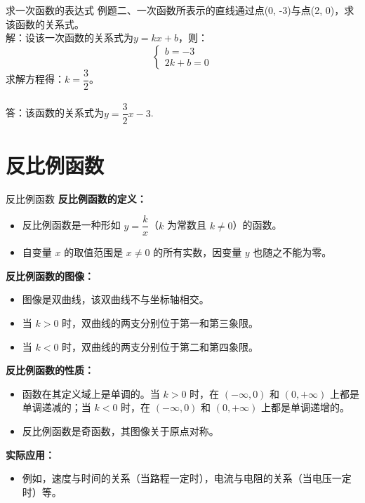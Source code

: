 \documentclass[aspectratio=169]{ctexbeamer} %
\begin{document}
\begin{frame}[t]{求一次函数的表达式}
例题二、一次函数所表示的直线通过点(0, -3)与点(2, 0)，求该函数的关系式。\\
解：设该一次函数的关系式为$y = kx + b$，则：\\
\begin{equation}
\begin{cases}
b = -3 \\
2k + b = 0
\end{cases}
\end{equation}
求解方程得：$k = \dfrac{3}{2}$。\\
\\
答：该函数的关系式为$y = \dfrac{3}{2}x - 3$.
\end{frame}

\section{反比例函数}

\begin{frame}{反比例函数}
    \textbf{反比例函数的定义：}
    \begin{itemize}
        \item 反比例函数是一种形如 \( y = \dfrac{k}{x} \)（\( k \) 为常数且 \( k \neq 0 \)）的函数。
        \item 自变量 \( x \) 的取值范围是 \( x \neq 0 \) 的所有实数，因变量 \( y \) 也随之不能为零。
    \end{itemize}

    \vspace{0.5cm}
    \textbf{反比例函数的图像：}
    \begin{itemize}
        \item 图像是双曲线，该双曲线不与坐标轴相交。
        \item 当 \( k > 0 \) 时，双曲线的两支分别位于第一和第三象限。
        \item 当 \( k < 0 \) 时，双曲线的两支分别位于第二和第四象限。
    \end{itemize}

    \vspace{0.5cm}
    \textbf{反比例函数的性质：}
    \begin{itemize}
        \item 函数在其定义域上是单调的。当 \( k > 0 \) 时，在 \( (-\infty, 0) \) 和 \( (0, +\infty) \) 上都是单调递减的；当 \( k < 0 \) 时，在 \( (-\infty, 0) \) 和 \( (0, +\infty) \) 上都是单调递增的。
        \item 反比例函数是奇函数，其图像关于原点对称。
    \end{itemize}

    \vspace{0.5cm}
    \textbf{实际应用：}
    \begin{itemize}
        \item 例如，速度与时间的关系（当路程一定时），电流与电阻的关系（当电压一定时）等。
    \end{itemize}
\end{frame}
\end{document}
